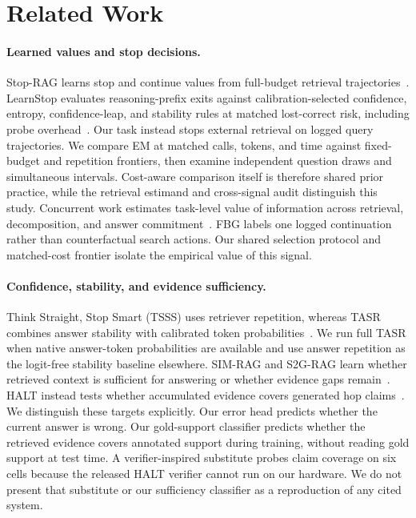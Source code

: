 \section{Related Work}
\label{sec:related}

\paragraph{Learned values and stop decisions.}
Stop-RAG learns stop and continue values from full-budget retrieval
trajectories~\cite{park2025stoprag}. LearnStop evaluates reasoning-prefix exits against calibration-selected
confidence, entropy, confidence-leap, and stability rules at matched
lost-correct risk, including probe overhead~\cite{dong2026learnstop}.
Our task instead stops external retrieval on logged query trajectories.
We compare EM at matched calls, tokens, and time against fixed-budget and
repetition frontiers, then examine independent question draws and simultaneous
intervals. Cost-aware comparison itself is therefore shared prior practice,
while the retrieval estimand and cross-signal audit distinguish this study. Concurrent work estimates
task-level value of information across retrieval, decomposition, and answer
commitment~\cite{fang2026inference}. FBG labels one logged continuation rather than counterfactual search actions.
Our shared selection protocol and matched-cost frontier isolate the empirical
value of this signal.

\paragraph{Confidence, stability, and evidence sufficiency.}
Think Straight, Stop Smart (TSSS) uses retriever repetition, whereas TASR
combines answer stability with calibrated token probabilities~\cite{bang2025think,kieback2026tasr}.
We run full
TASR when native answer-token probabilities are available and use
answer repetition as the logit-free stability baseline elsewhere. SIM-RAG and
S2G-RAG learn whether retrieved context is sufficient for answering or whether
evidence gaps remain~\cite{yang2025simrag,li2026s2grag}. HALT instead tests
whether accumulated evidence covers generated hop claims~\cite{roh2026halt}.
We distinguish these targets explicitly. Our error head predicts whether the
current answer is wrong. Our gold-support classifier predicts whether the
retrieved evidence covers annotated support during training, without reading
gold support at test time. A verifier-inspired substitute probes claim
coverage on six cells because the released HALT verifier cannot run on our
hardware. We do not present that substitute or our sufficiency classifier as a
reproduction of any cited system.

